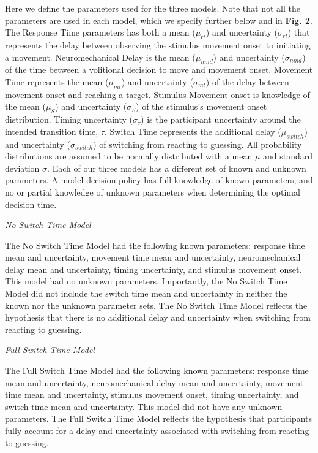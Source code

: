 \documentclass[man,floatsintext,letterpaper,12pt]{apa7}
\newcommand\boldblue[1]{\textcolor{mydarkblue}{\textbf{#1}}}
\begin{document}
\noindent Here we define the parameters used for the three models. Note that not all the parameters are used in each model, which we specify further below and in \boldblue{Fig. 2}. The Response Time parameters has both a mean ($\mu_{rt}$) and uncertainty ($\sigma_{rt}$) that represents the delay between observing the stimulus movement onset to initiating a movement. Neuromechanical Delay is the mean ($\mu_{nmd}$) and uncertainty ($\sigma_{nmd}$) of the time between a volitional decision to move and movement onset. Movement Time represents the mean ($\mu_{mt}$) and uncertainty ($\sigma_{mt}$) of the delay between movement onset and reaching a target. Stimulus Movement onset is knowledge of the mean ($\mu_{S}$) and uncertainty ($\sigma_{S}$) of the stimulus’s movement onset distribution. Timing uncertainty ($\sigma_{\tau}$) is the participant uncertainty around the intended transition time, $\tau$. Switch Time represents the additional delay ($\mu_{switch}$) and uncertainty  ($\sigma_{switch}$) of switching from reacting to guessing. All probability distributions are assumed to be normally distributed with a mean $\mu$ and standard deviation $\sigma$.  Each of our three models has a different set of known and unknown parameters. A model decision policy has full knowledge of known parameters, and no or partial knowledge of unknown parameters when determining the optimal decision time.

\vspace{2mm}
\noindent \emph{No Switch Time Model}

\noindent The No Switch Time Model had the following known parameters: response time mean and uncertainty, movement time mean and uncertainty, neuromechanical delay mean and uncertainty, timing uncertainty, and stimulus movement onset. This model had no unknown parameters. Importantly, the No Switch Time Model did not include the switch time mean and uncertainty in neither the known nor the unknown parameter sets. The No Switch Time Model reflects the hypothesis that there is no additional delay and uncertainty when switching from reacting to guessing.

\vspace*{2mm}
\noindent \emph{Full Switch Time Model}

\noindent The Full Switch Time Model had the following known parameters: response time mean and uncertainty, neuromechanical delay mean and uncertainty, movement time mean and uncertainty, stimulus movement onset, timing uncertainty, and switch time mean and uncertainty. This model did not have any unknown parameters. The Full Switch Time Model reflects the hypothesis that participants fully account for a delay and uncertainty associated with switching from reacting to guessing.
\end{document}
